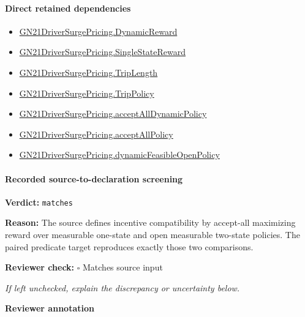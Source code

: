 \documentclass[10pt]{article}
\newcommand{\reviewerbox}{%
  \par\noindent\fbox{\parbox{0.96\linewidth}{\rule{0pt}{0.38in}}}\par
}
\newcommand{\reviewmatch}[1]{%
  \par\noindent\textbf{Reviewer check:} $\square$\; #1\par
  \noindent\emph{If left unchecked, explain the discrepancy or uncertainty below.}\par
}
\begin{document}
\paragraph{Direct retained dependencies}
\begin{itemize}\raggedright
\item \hyperlink{governing-declaration-44499c14a74f0062}{GN21\allowbreak{}Driver\allowbreak{}Surge\allowbreak{}Pricing.\allowbreak{}Dynamic\allowbreak{}Reward}
\item \hyperlink{governing-declaration-f7708ce48623a5e0}{GN21\allowbreak{}Driver\allowbreak{}Surge\allowbreak{}Pricing.\allowbreak{}Single\allowbreak{}State\allowbreak{}Reward}
\item \hyperlink{governing-declaration-a616c143f22cf2bc}{GN21\allowbreak{}Driver\allowbreak{}Surge\allowbreak{}Pricing.\allowbreak{}Trip\allowbreak{}Length}
\item \hyperlink{governing-declaration-4312ad4cb899871f}{GN21\allowbreak{}Driver\allowbreak{}Surge\allowbreak{}Pricing.\allowbreak{}Trip\allowbreak{}Policy}
\item \hyperlink{governing-declaration-cbeef38fdd703fea}{GN21\allowbreak{}Driver\allowbreak{}Surge\allowbreak{}Pricing.\allowbreak{}accept\allowbreak{}All\allowbreak{}Dynamic\allowbreak{}Policy}
\item \hyperlink{governing-declaration-e94c9281d4f4b12d}{GN21\allowbreak{}Driver\allowbreak{}Surge\allowbreak{}Pricing.\allowbreak{}accept\allowbreak{}All\allowbreak{}Policy}
\item \hyperlink{governing-declaration-872ce4c6cb27cc60}{GN21\allowbreak{}Driver\allowbreak{}Surge\allowbreak{}Pricing.\allowbreak{}dynamic\allowbreak{}Feasible\allowbreak{}Open\allowbreak{}Policy}
\end{itemize}
\paragraph{Recorded source-to-declaration screening}
\textbf{Verdict:} \texttt{matches}
\\
{\raggedright
\textbf{Reason:} The source defines incentive compatibility by accept-\allowbreak{}all maximizing reward over measurable one-\allowbreak{}state and open measurable two-\allowbreak{}state policies.\allowbreak{} The paired predicate target reproduces exactly those two comparisons.\allowbreak{}
\par}
\reviewmatch{Matches source input}
\noindent\textbf{Reviewer annotation}\par
\reviewerbox
\clearpage
\hypertarget{paper-prerequisite-8cb807f3cc8978b3}{}
\end{document}

